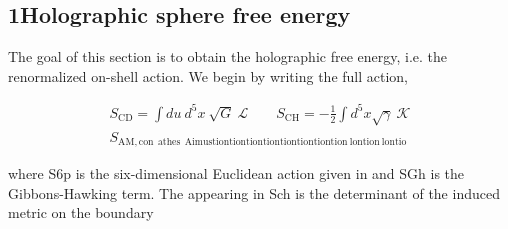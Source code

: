 \documentclass{article}
\begin{document}
\subsection*{1Holographic sphere free energy}


The goal of this section is to obtain the holographic free energy, i.e. the renormalized on-shell
action. We begin by writing the full action,


\begin{equation}
\begin{array} { r } { S _ { \mathrm { C D } } = \int d u ~ d ^ { 5 } x ~ \sqrt { G } ~ \mathcal { L } \qquad S _ { \mathrm { C H } } = - \frac { 1 } { 2 } \int d ^ { 5 } x \sqrt { \gamma } ~ \mathcal { K } } \\ { S _ { \mathrm { A M, c o n ~ ~ a t h e s ~ ~ A i m u s t i o n t i o n t i o n t i o n t i o n t i o n t i o n t i o n ~ l o n t i o n ~ l o n t i o}}}\end{array}
\end{equation}


where S6p is the six-dimensional Euclidean action given in and SGh is the Gibbons-Hawking
term. The  appearing in Sch is the determinant of the induced metric on the boundary
\end{document}

